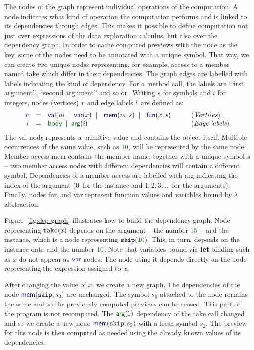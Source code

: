 \documentclass[fleqn,11pt]{report}
\newcommand{\lsep}[0]{\;\; | \;\;}
\newcommand{\kvd}[1]{\textnormal{\ttfamily\bfseries #1}}
\newcommand{\ident}[1]{\textnormal{\ttfamily #1}}
\newcommand{\Num}[1]{\textcolor{numclr}{#1}}
\newcommand{\bndclr}[1]{\textcolor{kvdclr}{#1}}
\newcommand{\blblclr}[1]{\textcolor{numclr}{#1}}
\newcommand{\bnd}[1]{\textnormal{\textcolor{kvdclr}{\sffamily #1}}}
\newcommand{\blbl}[1]{\textnormal{\textcolor{numclr}{\sffamily #1}}}
\theoremstyle{definition}
\begin{document}
The nodes of the graph represent individual operations of the computation. A node indicates what
kind of operation the computation performs and is linked to its dependencies through edges.
This makes it possible to define computation not just over expressions of the data exploration
calculus, but also over the dependency graph. In order to cache computed previews with the node
as the key, some of the nodes need to be annotated with a unique symbol. That way, we can
create two unique nodes representing, for example, access to a member named \ident{take} which
differ in their dependencies. The graph edges are labelled with labels indicating the kind of
dependency. For a method call, the labels are ``first argument'', ``second argument'' and so on.
Writing $s$ for symbols and $i$ for integers, nodes (vertices) $\bndclr{v}$ and edge labels
$\blblclr{l}$ are defined as:
%
\begin{equation*}
\begin{array}{rcll}
\bndclr{v}&=&\bnd{val}(o) \lsep \bnd{var}(x)\lsep \bnd{mem}(m, s)\lsep \bnd{fun}(x, s)&\qquad(\textit{Vertices})\\
\blblclr{l}&=&\blbl{body} \lsep \blbl{arg}(i)&\qquad(\textit{Edge labels})\\
\end{array}
\end{equation*}
%
The \bnd{val} node represents a primitive value and contains the object itself. Multiple occurrences
of the same value, such as $\Num{10}$, will be represented by the same node. Member access \bnd{mem}
contains the member name, together with a unique symbol $s$ -- two member access nodes with
different dependencies will contain a different symbol. Dependencies of a member access are labelled
with \blbl{arg} indicating the index of the argument ($0$~for the instance and $1,2,3,\ldots$ for the
arguments). Finally, nodes \bnd{fun} and \bnd{var} represent function values and variables
bound by $\lambda$ abstraction.

Figure~\ref{fig:dep-graph} illustrates how to build the
dependency graph. Node representing $\ident{take}(x)$ depends on the argument -- the
number $\Num{15}$ -- and the instance, which is a node representing $\ident{skip}(\Num{10})$.
This, in turn, depends on the instance \ident{data} and the number $\Num{10}$. Note that variables
bound via \kvd{let} binding such as $x$ do not appear as $\bnd{var}$ nodes. The node using it
depends directly on the node representing the expression assigned to $x$.

After changing the value of $x$, we create a new graph. The dependencies of the node
$\bnd{mem}(\ident{skip}, s_0)$ are unchanged. The symbol $s_0$ attached to the node remains
the same and so the previously computed previews can be reused. This part of the program is not recomputed.
The $\blbl{arg}(1)$ dependency of the \ident{take} call
changed and so we create a new node $\bnd{mem}(\ident{skip}, s_2)$ with a fresh symbol $s_2$.
The preview for this node is then computed as needed using the already known values of its
dependencies.
\end{document}
